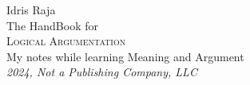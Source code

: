 \begin{titlepage}
	\raggedleft{}
	{\Large Idris Raja\\[1in]}
	{\large The HandBook for\\}
	{\Huge\scshape Logical Argumentation\\[.2in]}
	{\large My notes while learning Meaning and Argument\\}
	\vfill
	{\itshape 2024, Not a Publishing Company, LLC\/}
\end{titlepage}
